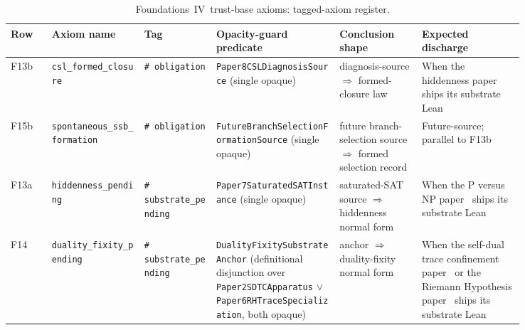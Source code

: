 \documentclass[11pt]{article}
\newcommand{\FIV}{Foundations~IV}
\newcommand{\PaperSDTC}{the self-dual trace confinement paper}
\newcommand{\PaperRH}{the Riemann Hypothesis paper}
\newcommand{\PaperPvNP}{the P versus NP paper}
\newcommand{\PaperCSL}{the hiddenness paper}
\theoremstyle{definition}
\begin{document}
\begin{landscape}
\begin{table}[p]
  \centering
  \footnotesize
  \begin{tabularx}{\linewidth}{@{}
      >{\raggedright\arraybackslash}p{0.08\linewidth}
      >{\raggedright\arraybackslash}p{0.18\linewidth}
      >{\raggedright\arraybackslash}p{0.14\linewidth}
      >{\raggedright\arraybackslash}p{0.24\linewidth}
      >{\raggedright\arraybackslash}X
      >{\raggedright\arraybackslash}p{0.20\linewidth}@{}}
    \toprule
    Row & Axiom name & Tag & Opacity-guard predicate &
    Conclusion shape & Expected discharge \\
    \midrule
    F13b &
    \texttt{csl\_formed\_closure} &
    \texttt{\# obligation} &
    \texttt{Paper8CSLDiagnosis}\newline\texttt{Source} (single opaque) &
    diagnosis-source \(\Rightarrow\) formed-closure law &
    When \PaperCSL\ \citep{Tsiokos2026CSL} ships its substrate Lean \\
    F15b &
    \texttt{spontaneous\_ssb\_}\newline\texttt{formation} &
    \texttt{\# obligation} &
    \texttt{FutureBranchSelection}\newline\texttt{FormationSource}
    (single opaque) &
    future branch-selection source \(\Rightarrow\) formed selection record &
    Future-source; parallel to F13b \\
    F13a &
    \texttt{hiddenness\_pending} &
    \texttt{\# substrate\_}\newline\texttt{pending} &
    \texttt{Paper7SaturatedSAT}\newline\texttt{Instance} (single opaque) &
    saturated-SAT source \(\Rightarrow\) hiddenness normal form &
    When \PaperPvNP\ \citep{Tsiokos2026PvNP} ships its substrate Lean \\
    F14 &
    \texttt{duality\_fixity\_}\newline\texttt{pending} &
    \texttt{\# substrate\_}\newline\texttt{pending} &
    \texttt{DualityFixity}\newline\texttt{SubstrateAnchor}
    (definitional disjunction over
    \texttt{Paper2SDTCApparatus} \(\lor\)
    \texttt{Paper6RHTrace}\newline\texttt{Specialization}, both opaque) &
    anchor \(\Rightarrow\) duality-fixity normal form &
    When \PaperSDTC\ \citep{Tsiokos2026SDTC} or \PaperRH\
    \citep{Tsiokos2026RH} ships its substrate Lean \\
    \bottomrule
  \end{tabularx}
  \caption{\FIV\ trust-base axioms: tagged-axiom register.}
  \label{tab:tagged-axiom-register}
\end{table}
\end{landscape}
 
\end{document}
